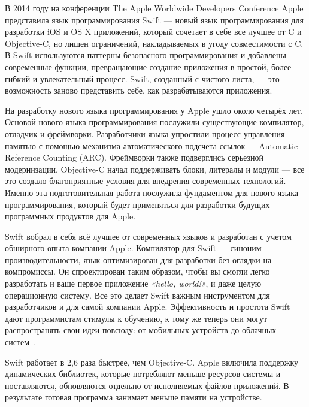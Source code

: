 
В 2014 году на конференции The Apple Worldwide Developers Conference Apple
представила язык программирования Swift --- новый язык программирования
для разработки iOS и OS X приложений, который сочетает в себе все лучшее от C и Objective-C,
но лишен ограничений, накладываемых в угоду совместимости с C.
В Swift используются паттерны безопасного программирования и добавлены
современные функции, превращающие создание приложения в простой,
более гибкий и увлекательный процесс. Swift, созданный с чистого листа, ---
это возможность заново представить себе, как разрабатываются приложения.

На разработку нового языка программирования у Apple ушло около четырёх лет.
Основой нового языка программирования послужили существующие компилятор,
отладчик и фреймворки. Разработчики языка упростили процесс управления памятью
с помощью механизма автоматического подсчета ссылок --- Automatic Reference Counting (ARC).
Фреймворки также подверглись серьезной модернизации. Objective-C начал
поддерживать блоки, литералы и модули --- все это создало благоприятные условия
для внедрения современных технологий. Именно эта подготовительная работа
послужила фундаментом для нового языка программирования,
который будет применяться для разработки будущих программных продуктов для Apple.

Swift вобрал в себя всё лучшее от современных языков и разработан с учетом
обширного опыта компании Apple. Компилятор для Swift --- синоним производительности,
язык оптимизирован для разработки без оглядки на компромиссы.
Он спроектирован таким образом, чтобы вы смогли легко разработать
и ваше первое приложение \textit{«hello, world!»}, и даже целую операционную систему.
Все это делает Swift важным инструментом для разработчиков и для самой компании Apple.
Эффективность и простота Swift дают программистам стимулы к обучению,
к тому же теперь они могут распространять свои идеи повсюду:
от мобильных устройств до облачных систем~\cite{about_swift, swift_becomes_open_source}.

Swift работает в 2,6 раза быстрее, чем Objective-C. Apple включила поддержку
динамических библиотек, которые потребляют меньше ресурсов системы и поставляются,
обновляются отдельно от исполняемых файлов приложений.
В результате готовая программа занимает меньше памяти на устройстве.

